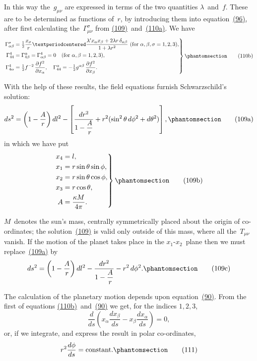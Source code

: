 \documentclass[12pt]{book}[2005/09/16]
\newcommand{\Change}[2]{#2}
\newcommand{\Add}[1]{\Change{}{#1}}
\newcommand{\PageSep}[1]{\ignorespaces}
\newcommand{\Tag}[1]{%
  \phantomsection
  \label{eqn:#1}
  \tag*{#1}
}
\newcommand{\Eqref}[1]{\hyperref[eqn:#1]{#1}}
\newcommand{\dd}{\partial}
\begin{document}
In this way the~$g_{\mu\nu}$ are expressed in terms of the two
quantities $\lambda$~and~$f$. These are to be determined as functions
of~$r$, by introducing them into equation~\Eqref{(96)}, after
\PageSep{105}
first calculating the~$\Change{{\Gamma_{\sigma}}^{\mu\nu}}{\Gamma_{\mu\nu}^{\sigma}}$ from \Eqref{(\Change{107}{109})}~and~\Eqref{(\Change{108a}{110a})}. We
have
\[
\left.
\begin{aligned}
\Gamma_{\alpha\beta}^{\sigma}
  &= \tfrac{1}{2} \frac{x_{\sigma}}{r}
     · \frac{\lambda' x_{\alpha} x_{\beta} + 2\lambda r\, \delta_{\alpha\beta}}
            {1 + \lambda r^{2}}
  \text{ (for $\alpha, \beta, \sigma = 1, 2, 3$)}\Add{,} \\
%
\Gamma_{44}^{4}
  &= \Gamma_{4\beta}^{\alpha} = \Gamma_{\alpha\beta}^{4} = 0\quad
  \text{(for $\alpha, \beta = 1, 2, 3$)}\Add{,} \\
%
\Gamma_{4\alpha}^{4} &= \tfrac{1}{2} f^{-2}\, \frac{\dd f^{2}}{\dd x_{\alpha}},\quad
\Gamma_{44}^{\alpha}
  = -\tfrac{1}{2} \Change{f^{-2}}{g^{\alpha\beta}}\,
     \frac{\dd f^{2}}{\dd \Change{x_{\alpha}}{x_{\beta}}}\Add{.}
\end{aligned}
\right\}
\Tag{(\Change{108b}{110b})}
\]

With the help of these results, the field equations
furnish Schwarzschild's solution:
\[
ds^{2} = \left(1 - \frac{A}{r}\right) dl^{2} - \left[
  \frac{dr^{2}}
       {1 - \dfrac{A}{r}} + r^{2} (\sin^{2}\theta\, d\phi^{2} + d\theta^{2})
\right]\Add{,}
\Tag{(\Change{109}{109a})}
\]
in which we have put
\[
\left.
\begin{aligned}
x_{4} &= l\Add{,} \\
x_{1} &= r \sin\theta \sin\phi\Add{,} \\
x_{2} &= r \sin\theta \cos\phi\Add{,} \\
x_{3} &= r \cos\theta \Add{,} \\
A &= \frac{\kappa M}{4\pi}\Add{.}
\end{aligned}
\right\}
\Tag{(\Change{109a}{109b})}
\]

$M$~denotes the sun's mass, centrally symmetrically
placed about the origin of co-ordinates; the solution~\Eqref{(109)}
is valid only outside of this mass, where all the~$T_{\mu\nu}$ vanish.
If the motion of the planet takes place in the $x_{1}$-$x_{2}$~plane
then we must replace~\Eqref{(\Change{109}{109a})} by
\[
ds^{2} = \left(1 - \frac{A}{r}\right) dl^{2}
  - \frac{dr^{2}}{1 - \dfrac{A}{r}} - r^{2}\, d\phi^{2}\Add{.}
\Tag{(\Change{109b}{109c})}
\]
\PageSep{106}

The calculation of the planetary motion depends upon
equation~\Eqref{(90)}. From the first of equations \Eqref{(\Change{108b}{110b})}~and~\Eqref{(90)}
we get, for the indices $1, 2, 3$,
\[
\frac{d}{ds}
  \left(x_{\alpha} \frac{dx_{\beta}}{ds} - x_{\beta} \frac{dx_{\alpha}}{ds}\right) = 0\Add{,}
\]
or, if we integrate, and express the result in polar co-ordinates,
\[
r^{2} \frac{d\phi}{ds} = \text{constant}.
\Tag{(111)}
\]
\end{document}
